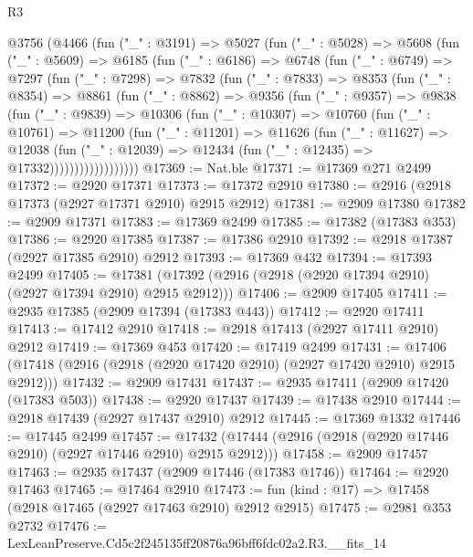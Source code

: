 \begin{lexlean}{R3}
\begin{coremodule}
  @3756
    (@4466
      (fun ("_" : @3191) =>
      @5027
        (fun ("_" : @5028) =>
        @5608
          (fun ("_" : @5609) =>
          @6185
            (fun ("_" : @6186) =>
            @6748
              (fun ("_" : @6749) =>
              @7297
                (fun ("_" : @7298) =>
                @7832
                  (fun ("_" : @7833) =>
                  @8353
                    (fun ("_" : @8354) =>
                    @8861
                      (fun ("_" : @8862) =>
                      @9356
                        (fun ("_" : @9357) =>
                        @9838
                          (fun ("_" : @9839) =>
                          @10306
                            (fun ("_" : @10307) =>
                            @10760
                              (fun ("_" : @10761) =>
                              @11200
                                (fun ("_" : @11201) =>
                                @11626
                                  (fun ("_" : @11627) =>
                                  @12038
                                    (fun ("_" : @12039) =>
                                    @12434 (fun ("_" : @12435) => @17332))))))))))))))))))
@17369 := Nat.ble
@17371 := @17369 @271 @2499
@17372 := @2920 @17371
@17373 := @17372 @2910
@17380 := @2916 (@2918 @17373 (@2927 @17371 @2910) @2915 @2912)
@17381 := @2909 @17380
@17382 := @2909 @17371
@17383 := @17369 @2499
@17385 := @17382 (@17383 @353)
@17386 := @2920 @17385
@17387 := @17386 @2910
@17392 := @2918 @17387 (@2927 @17385 @2910) @2912
@17393 := @17369 @432
@17394 := @17393 @2499
@17405 := @17381 (@17392 (@2916 (@2918 (@2920 @17394 @2910) (@2927 @17394 @2910) @2915 @2912)))
@17406 := @2909 @17405
@17411 := @2935 @17385 (@2909 @17394 (@17383 @443))
@17412 := @2920 @17411
@17413 := @17412 @2910
@17418 := @2918 @17413 (@2927 @17411 @2910) @2912
@17419 := @17369 @453
@17420 := @17419 @2499
@17431 := @17406 (@17418 (@2916 (@2918 (@2920 @17420 @2910) (@2927 @17420 @2910) @2915 @2912)))
@17432 := @2909 @17431
@17437 := @2935 @17411 (@2909 @17420 (@17383 @503))
@17438 := @2920 @17437
@17439 := @17438 @2910
@17444 := @2918 @17439 (@2927 @17437 @2910) @2912
@17445 := @17369 @1332
@17446 := @17445 @2499
@17457 := @17432 (@17444 (@2916 (@2918 (@2920 @17446 @2910) (@2927 @17446 @2910) @2915 @2912)))
@17458 := @2909 @17457
@17463 := @2935 @17437 (@2909 @17446 (@17383 @1746))
@17464 := @2920 @17463
@17465 := @17464 @2910
@17473 := fun (kind : @17) => @17458 (@2918 @17465 (@2927 @17463 @2910) @2912 @2915)
@17475 := @2981 @353 @2732
@17476 := LexLeanPreserve.Cd5c2f245135ff20876a96bff6fdc02a2.R3.__fits_14

\end{coremodule}
\end{lexlean}
